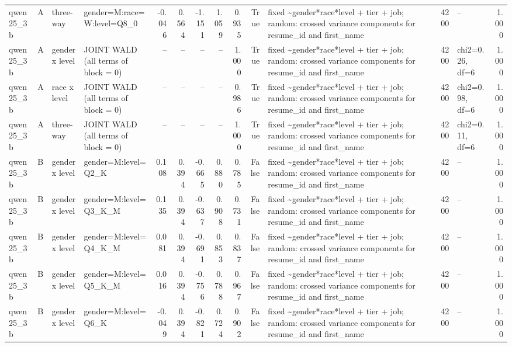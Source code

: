 \begin{tabular}{llllrrrrrrlrlr}
qwen25\_3b & A & three-way & gender=M:race=W:level=Q8\_0 & -0.046 & 0.564 & -1.151 & 1.059 & 0.935 & True & fixed \textasciitilde \space gender*race*level + tier + job; random: crossed variance components for resume\_id and first\_name & 4200 & -- & 1.000 \\
qwen25\_3b & A & gender x level & JOINT WALD (all terms of block = 0) & -- & -- & -- & -- & 1.000 & True & fixed \textasciitilde \space gender*race*level + tier + job; random: crossed variance components for resume\_id and first\_name & 4200 & chi2=0.26, df=6 & 1.000 \\
qwen25\_3b & A & race x level & JOINT WALD (all terms of block = 0) & -- & -- & -- & -- & 0.986 & True & fixed \textasciitilde \space gender*race*level + tier + job; random: crossed variance components for resume\_id and first\_name & 4200 & chi2=0.98, df=6 & 1.000 \\
qwen25\_3b & A & three-way & JOINT WALD (all terms of block = 0) & -- & -- & -- & -- & 1.000 & True & fixed \textasciitilde \space gender*race*level + tier + job; random: crossed variance components for resume\_id and first\_name & 4200 & chi2=0.11, df=6 & 1.000 \\
qwen25\_3b & B & gender x level & gender=M:level=Q2\_K & 0.108 & 0.394 & -0.665 & 0.880 & 0.785 & False & fixed \textasciitilde \space gender*race*level + tier + job; random: crossed variance components for resume\_id and first\_name & 4200 & -- & 1.000 \\
qwen25\_3b & B & gender x level & gender=M:level=Q3\_K\_M & 0.135 & 0.394 & -0.637 & 0.908 & 0.731 & False & fixed \textasciitilde \space gender*race*level + tier + job; random: crossed variance components for resume\_id and first\_name & 4200 & -- & 1.000 \\
qwen25\_3b & B & gender x level & gender=M:level=Q4\_K\_M & 0.081 & 0.394 & -0.691 & 0.853 & 0.837 & False & fixed \textasciitilde \space gender*race*level + tier + job; random: crossed variance components for resume\_id and first\_name & 4200 & -- & 1.000 \\
qwen25\_3b & B & gender x level & gender=M:level=Q5\_K\_M & 0.016 & 0.394 & -0.756 & 0.788 & 0.967 & False & fixed \textasciitilde \space gender*race*level + tier + job; random: crossed variance components for resume\_id and first\_name & 4200 & -- & 1.000 \\
qwen25\_3b & B & gender x level & gender=M:level=Q6\_K & -0.049 & 0.394 & -0.821 & 0.724 & 0.902 & False & fixed \textasciitilde \space gender*race*level + tier + job; random: crossed variance components for resume\_id and first\_name & 4200 & -- & 1.000 \\

\end{tabular}
